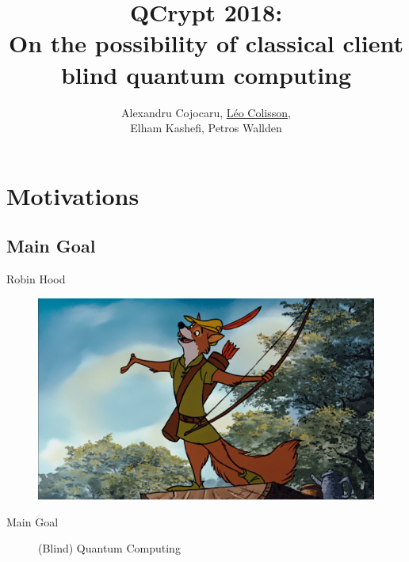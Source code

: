 \documentclass[table]{beamer}
\title[QFactory and classical blind quantum computing]{QCrypt 2018:\\On the possibility of classical client blind quantum computing}
\author[A. Cojocaru, L. Colisson, E. Kashefi, P. Wallden]{Alexandru Cojocaru, \underline{Léo Colisson},\\ Elham Kashefi, Petros Wallden}
\begin{document}

\begin{frame}
  \titlepage
\end{frame}



\section{Motivations}

\subsection{Main Goal}

\begin{frame}{Robin Hood}
  \begin{figure}[ht]
    \centering
    \includegraphics[width=.8\textwidth]{figures/robin_hood.png}
  \end{figure}
\end{frame}


\begin{frame}{Main Goal}
  \begin{figure}[ht]
    \centering
    \caption{(Blind) Quantum Computing}
  \end{figure}
\end{frame}

\end{document}
